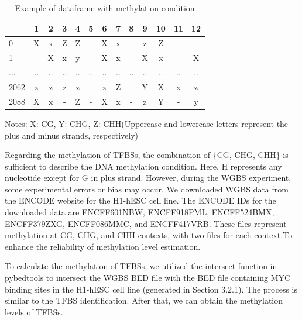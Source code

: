 \documentclass{PHlab-thesis}
\begin{document}
\begin{table}[H]
	\centering
	\begin{tabular}{l*{12}{c}}
		\toprule
		         & 1 &  2&  3&4  &5&6&7&8&  9& 10 & 11&12\\
		\midrule
	
		0     &X  &x  &Z  &Z  &-  &X  &x & -  &z  &Z  &-  &-\\
		1     &-  &X  &x  &y  &-  &X  &x  &-  &X  &x  &-  &X\\
		...   &.. &.. &.. &.. &.. &.. &.. &.. &.. &.. &.. &..\\
		2062  &z  &z  &z  &z  &-  &z  &Z  &- &Y   &X &x  &z\\
		2088  &X  &x  &-  &Z  &-  &X  &x  &-  &z  &Y  &-  &y\\
		\bottomrule

	\end{tabular}
	\begin{minipage}{9.5cm}
		\vspace{0.15cm}
		\footnotesize  Notes: X: CG, Y: CHG, Z: CHH(Uppercase and lowercase letters represent the plus and minus strands, respectively)
		\end{minipage}
	\caption{Example of dataframe with methylation condition}
	\label{table:ctx}
\end{table}



Regarding the methylation of TFBSs, the combination of \{CG, CHG, CHH\} is sufficient to describe the DNA methylation condition. Here, H represents any nucleotide except for G in plus strand. However, during the WGBS experiment, some experimental errors or bias may occur.  We downloaded WGBS data from the ENCODE website for the H1-hESC cell line. The ENCODE IDs for the downloaded data are ENCFF601NBW, ENCFF918PML, ENCFF524BMX, ENCFF379ZXG, ENCFF086MMC, and ENCFF417VRB. These files represent methylation at CG, CHG, and CHH contexts, with two files for each context.To enhance the reliability of methylation level estimation.

To calculate the methylation of TFBSs, we utilized the intersect function in pybedtools to intersect the WGBS BED file with the BED file containing MYC binding sites in the H1-hESC cell line (generated in Section 3.2.1). The process is similar to the TFBS identification. After that, we can obtain the methylation levels of TFBSs.
\end{document}
